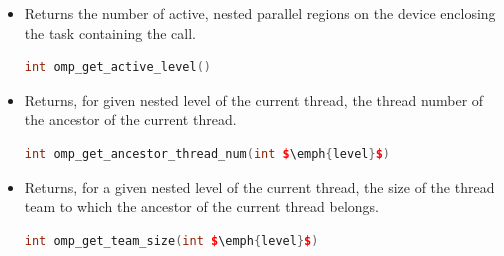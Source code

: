 \begin{itemize}
    \item Returns the number of active, nested parallel regions on the device enclosing the task containing the call.
    \begin{openmpbox}
        \begin{lstlisting}[language=C++]
int omp_get_active_level()\end{lstlisting}
    \end{openmpbox}
    
    \item Returns, for given nested level of the current thread, the thread number of the ancestor of the current thread.
    \begin{openmpbox}
        \begin{lstlisting}[language=C++]
int omp_get_ancestor_thread_num(int $\emph{level}$)\end{lstlisting}
    \end{openmpbox}
    
    \item Returns, for a given nested level of the current thread, the size of the thread team to which the ancestor of the current thread belongs.
    \begin{openmpbox}
        \begin{lstlisting}[language=C++]
int omp_get_team_size(int $\emph{level}$)\end{lstlisting}
    \end{openmpbox}
\end{itemize}